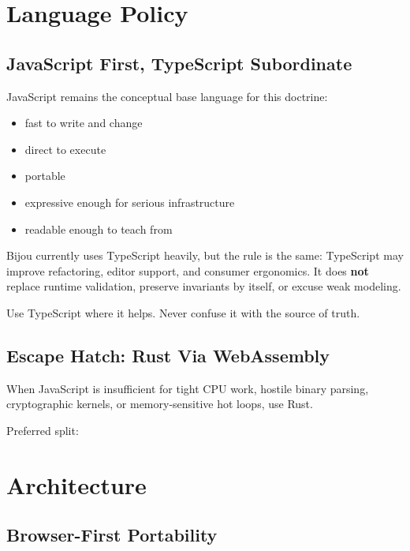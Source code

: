 \section{Language Policy}\label{record-060-language-policy}

\subsection{JavaScript First, TypeScript Subordinate}\label{record-060-javascript-first-typescript-subordinate}

JavaScript remains the conceptual base language for this doctrine:

\begin{itemize}
\tightlist
\item
  fast to write and change
\item
  direct to execute
\item
  portable
\item
  expressive enough for serious infrastructure
\item
  readable enough to teach from
\end{itemize}

Bijou currently uses TypeScript heavily, but the rule is the same: TypeScript may improve refactoring, editor support, and consumer ergonomics. It does \textbf{not} replace runtime validation, preserve invariants by itself, or excuse weak modeling.

Use TypeScript where it helps. Never confuse it with the source of truth.

\subsection{Escape Hatch: Rust Via WebAssembly}\label{record-060-escape-hatch-rust-via-webassembly}

When JavaScript is insufficient for tight CPU work, hostile binary parsing, cryptographic kernels, or memory-sensitive hot loops, use Rust.

Preferred split:



\section{Architecture}\label{record-060-architecture}

\subsection{Browser-First Portability}\label{record-060-browser-first-portability}

